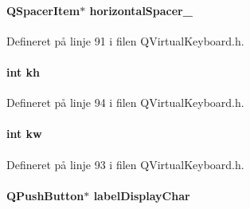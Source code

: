 \paragraph[{\texorpdfstring{horizontal\+Spacer\+\_\+2}{horizontalSpacer_2}}]{\setlength{\rightskip}{0pt plus 5cm}Q\+Spacer\+Item$\ast$ horizontal\+Spacer\+\_\hspace{0.3cm}{\ttfamily [private]}}\hypertarget{class_q_virtual_keyboard_ad8c8a25c788a6f06d18143815745542c}{}\label{class_q_virtual_keyboard_ad8c8a25c788a6f06d18143815745542c}


Defineret på linje 91 i filen Q\+Virtual\+Keyboard.\+h.

\paragraph[{\texorpdfstring{kh}{kh}}]{\setlength{\rightskip}{0pt plus 5cm}int kh\hspace{0.3cm}{\ttfamily [private]}}\hypertarget{class_q_virtual_keyboard_ac85dabb3c71c98632f077058f4bbe3c7}{}\label{class_q_virtual_keyboard_ac85dabb3c71c98632f077058f4bbe3c7}


Defineret på linje 94 i filen Q\+Virtual\+Keyboard.\+h.

\paragraph[{\texorpdfstring{kw}{kw}}]{\setlength{\rightskip}{0pt plus 5cm}int kw\hspace{0.3cm}{\ttfamily [private]}}\hypertarget{class_q_virtual_keyboard_a5a953764bcaf68b8491ec52111189e31}{}\label{class_q_virtual_keyboard_a5a953764bcaf68b8491ec52111189e31}


Defineret på linje 93 i filen Q\+Virtual\+Keyboard.\+h.

\paragraph[{\texorpdfstring{label\+Display\+Char}{labelDisplayChar}}]{\setlength{\rightskip}{0pt plus 5cm}Q\+Push\+Button$\ast$ label\+Display\+Char\hspace{0.3cm}{\ttfamily [private]}}\hypertarget{class_q_virtual_keyboard_a2230006aad7be0bfd701328870f4dcee}{}\label{class_q_virtual_keyboard_a2230006aad7be0bfd701328870f4dcee}


